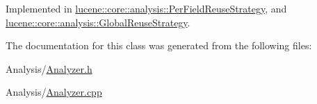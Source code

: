 Implemented in \mbox{\hyperlink{classlucene_1_1core_1_1analysis_1_1PerFieldReuseStrategy_ab23b95640469c639fd36ac888eeda1c3}{lucene\+::core\+::analysis\+::\+Per\+Field\+Reuse\+Strategy}}, and \mbox{\hyperlink{classlucene_1_1core_1_1analysis_1_1GlobalReuseStrategy_a168d01df604559cb787781ad0ab7d7c2}{lucene\+::core\+::analysis\+::\+Global\+Reuse\+Strategy}}.



The documentation for this class was generated from the following files\+:\begin{DoxyCompactItemize}
\item 
Analysis/\mbox{\hyperlink{Analyzer_8h}{Analyzer.\+h}}\item 
Analysis/\mbox{\hyperlink{Analyzer_8cpp}{Analyzer.\+cpp}}\end{DoxyCompactItemize}
